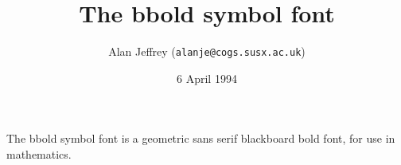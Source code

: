 \documentclass[pagesize=auto]{scrartcl}
\title{The \textsf{bbold} symbol font}
\author{Alan Jeffrey (\texttt{alanje@cogs.susx.ac.uk})}
\date{6 April 1994}
\begin{document}
\maketitle

\noindent
The \textsf{bbold} symbol font is a geometric
sans serif blackboard bold font, for use in mathematics.
\end{document}

